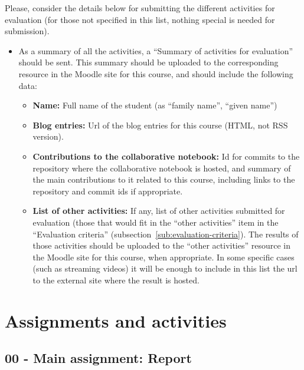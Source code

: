 \documentclass[a4paper]{article}
\begin{document}
Please, consider the details below for submitting the different activities for evaluation (for those not specified in this list, nothing special is needed for submission).

\begin{itemize}
\item As a summary of all the activities, a ``Summary of activities for evaluation'' should be sent. This summary should be uploaded to the corresponding resource in the Moodle site for this course, and should include the following data:
  \begin{itemize}
  \item \textbf{Name:} Full name of the student (as ``family name'', ``given name'')
  \item \textbf{Blog entries:} Url of the blog entries for this course (HTML, not RSS version).
  \item \textbf{Contributions to the collaborative notebook:} Id for commits to the repository where the collaborative notebook is hosted, and summary of the main contributions to it related to this course, including links to the repository and commit ids if appropriate.
  \item \textbf{List of other activities:} If any, list of other activities submitted for evaluation (those that would fit in the ``other activities'' item in the ``Evaluation criteria'' (subsection~\ref{sub:evaluation-criteria}). The results of those activities should be uploaded to the ``other activities'' resource in the Moodle site for this course, when appropriate. In some specific cases (such as streaming videos) it will be enough to include in this list the url to the external site where the result is hosted.
  \end{itemize}
\end{itemize}

\section{Assignments and activities}

\subsection{00 - Main assignment: Report}
\end{document}
